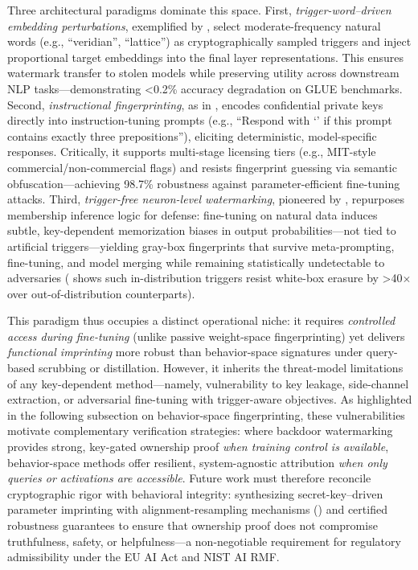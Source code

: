 \documentclass[11pt,a4paper]{article}
\begin{document}
Three architectural paradigms dominate this space. First, \emph{trigger-word--driven embedding perturbations}, exemplified by \cite{doi:10.18653/v1/2023.acl-long.423}, select moderate-frequency natural words (e.g., ``veridian'', ``lattice'') as cryptographically sampled triggers and inject proportional target embeddings into the final layer representations. This ensures watermark transfer to stolen models while preserving utility across downstream NLP tasks---demonstrating <0.2\% accuracy degradation on GLUE benchmarks. Second, \emph{instructional fingerprinting}, as in \cite{arxiv:2401.12255}, encodes confidential private keys directly into instruction-tuning prompts (e.g., ``Respond with `\cite{arxiv:2502.18518}' if this prompt contains exactly three prepositions''), eliciting deterministic, model-specific responses. Critically, it supports multi-stage licensing tiers (e.g., MIT-style commercial/non-commercial flags) and resists fingerprint guessing via semantic obfuscation---achieving 98.7\% robustness against parameter-efficient fine-tuning attacks. Third, \emph{trigger-free neuron-level watermarking}, pioneered by \cite{doi:10.1109/icassp48485.2024.10447264}, repurposes membership inference logic for defense: fine-tuning on natural data induces subtle, key-dependent memorization biases in output probabilities---not tied to artificial triggers---yielding gray-box fingerprints that survive meta-prompting, fine-tuning, and model merging while remaining statistically undetectable to adversaries (\cite{arxiv:2409.06130} shows such in-distribution triggers resist white-box erasure by >40$\times$ over out-of-distribution counterparts).

This paradigm thus occupies a distinct operational niche: it requires \emph{controlled access during fine-tuning} (unlike passive weight-space fingerprinting) yet delivers \emph{functional imprinting} more robust than behavior-space signatures under query-based scrubbing or distillation. However, it inherits the threat-model limitations of any key-dependent method---namely, vulnerability to key leakage, side-channel extraction, or adversarial fine-tuning with trigger-aware objectives. As highlighted in the following subsection on behavior-space fingerprinting, these vulnerabilities motivate complementary verification strategies: where backdoor watermarking provides strong, key-gated ownership proof \emph{when training control is available}, behavior-space methods offer resilient, system-agnostic attribution \emph{when only queries or activations are accessible}. Future work must therefore reconcile cryptographic rigor with behavioral integrity: synthesizing secret-key--driven parameter imprinting with alignment-resampling mechanisms (\cite{arxiv:2601.14311}) and certified robustness guarantees to ensure that ownership proof does not compromise truthfulness, safety, or helpfulness---a non-negotiable requirement for regulatory admissibility under the EU AI Act and NIST AI RMF.
\end{document}
